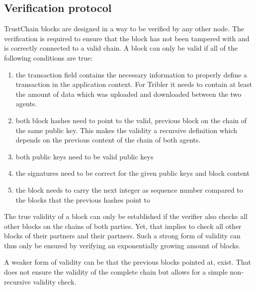 \subsection{Verification protocol}
\label{sec:validation}
TrustChain blocks are designed in a way to be verified by any other node. The verification is 
required to ensure that the block has not been tampered with and is correctly connected to a valid 
chain. A block can only be valid if all of the following conditions are true:

\begin{enumerate}
    \item the transaction field contains the necessary information to properly define a transaction 
    in the application context. For Tribler it needs to contain at least the amount of data which 
    was uploaded and downloaded between the two agents. 
    \item both block hashes need to point to the valid, previous block on the chain of the same 
    public key. This makes the validity a recursive definition which depends on the previous content
    of the chain of both agents.
    \item both public keys need to be valid public keys
    \item the signatures need to be correct for the given public keys and block content
    \item the block needs to carry the next integer as sequence number compared to the blocks that 
    the previous hashes point to
\end{enumerate}

The true validity of a block can only be established if the verifier also checks all other blocks on
the chains of both parties. Yet, that implies to check all other blocks of their partners and their
partners. Such a strong form of validity can thus only be ensured by verifying an exponentially 
growing amount of blocks.

A weaker form of validity can be that the previous blocks pointed at, exist. That does not ensure 
the validity of the complete chain but allows for a simple non-recursive validity check.

